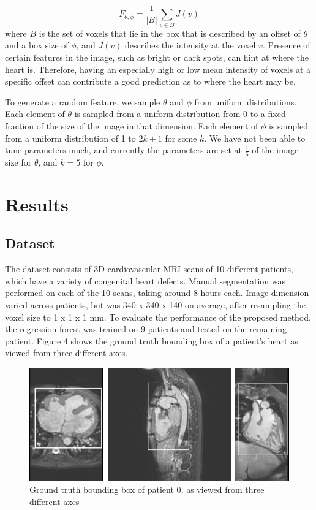 \begin{equation}
  F_{\theta, \phi} = \frac{1}{|B|} \sum_{v \in B} J(v)
\end{equation}
where $B$ is the set of voxels that lie in the box that is described by an offset of $\theta$ and a box size of $\phi$, and $J(v)$ describes the intensity at the voxel $v$. Presence of certain features in the image, such as bright or dark spots, can hint at where the heart is. Therefore, having an especially high or low mean intensity of voxels at a specific offset can contribute a good prediction as to where the heart may be.

To generate a random feature, we sample $\theta$ and $\phi$ from uniform distributions. Each element of $\theta$ is sampled from a uniform distribution from 0 to a fixed fraction of the size of the image in that dimension. Each element of $\phi$ is sampled from a uniform distribution of 1 to $2k+1$ for some $k$. We have not been able to tune parameters much, and currently the parameters are set at $\frac{1}{6}$ of the image size for $\theta$, and $k = 5$ for $\phi$. 

\section{Results}
\subsection{Dataset}
The dataset consists of 3D cardiovascular MRI scans of 10 different patients, which have a variety of congenital heart defects. Manual segmentation was performed on each of the 10 scans, taking around 8 hours each. Image dimension varied across patients, but was 340 x 340 x 140 on average, after resampling the voxel size to 1 x 1 x 1 mm. To evaluate the performance of the proposed method, the regression forest was trained on 9 patients and tested on the remaining patient. Figure 4 shows the ground truth bounding box of a patient's heart as viewed from three different axes.

\begin{figure}
\includegraphics[scale=1.0]{boundingboxes.png}
\caption{Ground truth bounding box of patient 0, as viewed from three different axes}
\end{figure}

